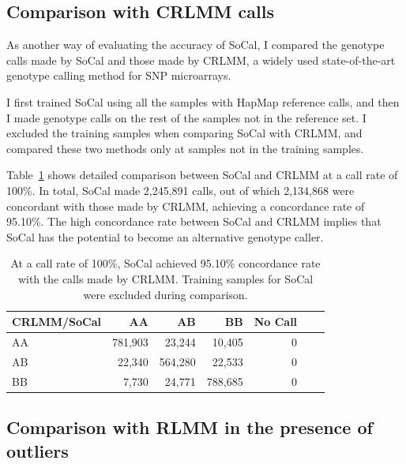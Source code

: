 \documentclass{scrartcl}
\begin{document}
\subsection{Comparison with CRLMM calls}

\par
As another way of evaluating the accuracy of SoCal, I compared the genotype
calls made by SoCal and those made by CRLMM, a widely used state-of-the-art
genotype calling method for SNP microarrays.

\par
I first trained SoCal using all the samples with HapMap reference calls, and
then I made genotype calls on the rest of the samples not in the reference set.
I excluded the training samples when comparing SoCal with CRLMM, and compared
these two methods only at samples not in the training samples.

\par
Table~\ref{table:cmp_socal_crlmm} shows detailed comparison between SoCal
and CRLMM at a call rate of 100\%.
In total, SoCal made 2,245,891 calls, out of which 2,134,868 were concordant
with those made by CRLMM, achieving a concordance rate of 95.10\%.
The high concordance rate between SoCal and CRLMM implies that SoCal has the
potential to become an alternative genotype caller.

\begin{table}[H]
\centering
\begin{tabular}{l*{5}{r}r}
    \hline
    CRLMM/SoCal   & AA       & AB      & BB      & No Call \\ \hline
    AA            & 781,903  & 23,244  & 10,405  & 0  \\
    AB            & 22,340   & 564,280 & 22,533  & 0  \\
    BB            & 7,730    & 24,771  & 788,685 & 0  \\ \hline
\end{tabular}
\caption{At a call rate of 100\%, SoCal achieved 95.10\% concordance rate
with the calls made by CRLMM. Training samples for SoCal were excluded during
comparison.}
\label{table:cmp_socal_crlmm}
\end{table}

\subsection{Comparison with RLMM in the presence of outliers}
\end{document}
